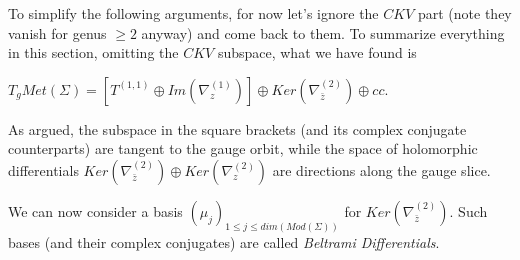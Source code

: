     To simplify the following arguments, for now let's ignore the $CKV$ part (note they vanish for genus $\ge 2$ anyway) and come back to them. To summarize everything in this section, omitting the $CKV$ subspace, what we have found is

    \begin{prop}
        $T_g Met(\Sigma) = [ T^{(1,1)} \oplus Im(\nabla^{(1)}_z) ] \oplus Ker(\nabla^{(2)}_{\bar z})\oplus cc.$
    \end{prop}

    As argued, the subspace in the square brackets (and its complex conjugate counterparts) are tangent to the gauge orbit, while the space of holomorphic differentials $Ker(\nabla^{(2)}_{\bar z})\oplus Ker(\nabla^{(2)}_{z})$ are directions along the gauge slice.

    We can now consider a basis $(\mu_j)_{1 \le j \le dim(Mod(\Sigma))}$ for $Ker(\nabla^{(2)}_{\bar z})$. Such bases (and their complex conjugates) are called \textit{Beltrami Differentials}.
